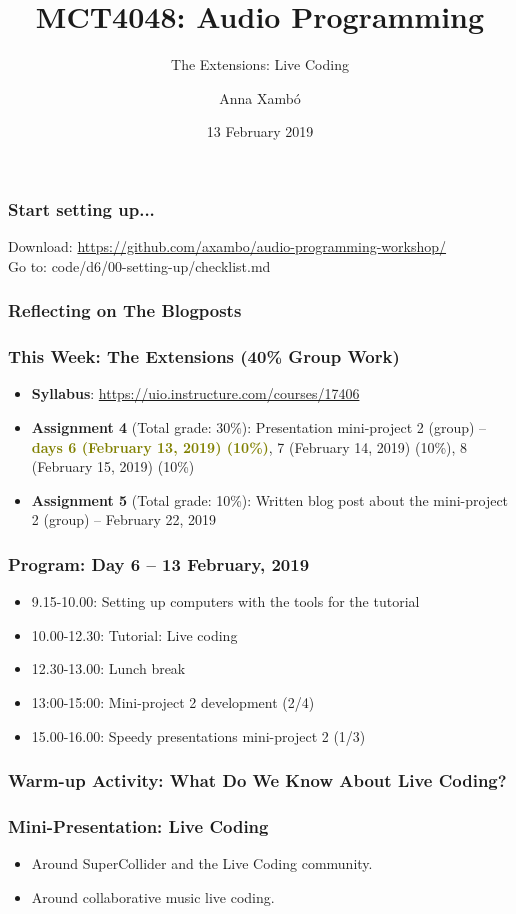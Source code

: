 \documentclass[screen, aspectratio=43]{beamer}
\title[AP-intro]{MCT4048: Audio Programming}
\subtitle{The Extensions: Live Coding}
\author[A. Xamb{\'o}]{Anna Xamb{\'o}}
\institute[NTNU]{Department of Music, NTNU}
\date{13 February 2019}
\begin{document}
\begin{frame}
  \titlepage
\end{frame}

%
\begin{frame}
\frametitle{Start setting up...}
Download: \url{https://github.com/axambo/audio-programming-workshop/} 
\\
\vspace{10 mm}
Go to: \textrm{code/d6/00-setting-up/checklist.md}
\end{frame}
%
\begin{frame}
\frametitle{Reflecting on The Blogposts}
\end{frame}
%
\begin{frame}
\frametitle{This Week: The Extensions (40\% Group Work)}
\begin{itemize}
\item \textbf{Syllabus}: \url{https://uio.instructure.com/courses/17406}
\item \textbf{Assignment 4} (Total grade: 30\%): Presentation mini-project 2 (group) -- \textbf{\textcolor{olive}{days 6 (February 13, 2019) (10\%)}}, 7 (February 14, 2019) (10\%), 8 (February 15, 2019) (10\%)
\item \textbf{Assignment 5} (Total grade: 10\%):  Written blog post about the mini-project 2 (group) -- February 22, 2019
\end{itemize}
\end{frame}
%
\begin{frame}
\frametitle{Program: Day 6 -- 13 February, 2019}
\begin{itemize}
\item 9.15-10.00: Setting up computers with the tools for the tutorial
\item 10.00-12.30: Tutorial: Live coding
\item 12.30-13.00: Lunch break
\item 13:00-15:00: Mini-project 2 development (2/4)
\item 15.00-16.00: Speedy presentations mini-project 2 (1/3)
\end{itemize}
\end{frame}
%
\begin{frame}
\frametitle{Warm-up Activity: What Do We Know About Live Coding?}
\end{frame}
%
\begin{frame}
\frametitle{Mini-Presentation: Live Coding}
\begin{itemize}
\item Around SuperCollider and the Live Coding community.
\item Around collaborative music live coding.
\end{itemize}
\end{frame}
\end{document}
